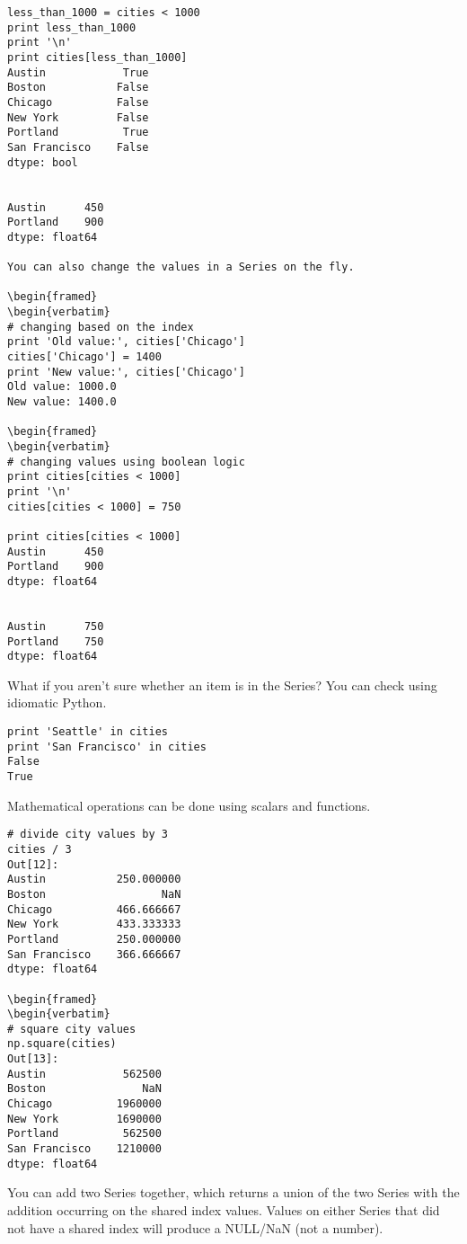 \documentclass[KSmain.tex]{subfiles}
\begin{document}
\begin{framed}
\begin{verbatim}
less_than_1000 = cities < 1000
print less_than_1000
print '\n'
print cities[less_than_1000]
Austin            True
Boston           False
Chicago          False
New York         False
Portland          True
San Francisco    False
dtype: bool


Austin      450
Portland    900
dtype: float64

You can also change the values in a Series on the fly.

\begin{framed}
\begin{verbatim}
# changing based on the index
print 'Old value:', cities['Chicago']
cities['Chicago'] = 1400
print 'New value:', cities['Chicago']
Old value: 1000.0
New value: 1400.0

\begin{framed}
\begin{verbatim}
# changing values using boolean logic
print cities[cities < 1000]
print '\n'
cities[cities < 1000] = 750

print cities[cities < 1000]
Austin      450
Portland    900
dtype: float64


Austin      750
Portland    750
dtype: float64
\end{verbatim}
\end{framed}
What if you aren't sure whether an item is in the Series? You can check using idiomatic Python.

\begin{framed}
\begin{verbatim}
print 'Seattle' in cities
print 'San Francisco' in cities
False
True
\end{verbatim}
\end{framed}
Mathematical operations can be done using scalars and functions.

\begin{framed}
\begin{verbatim}
# divide city values by 3
cities / 3
Out[12]:
Austin           250.000000
Boston                  NaN
Chicago          466.666667
New York         433.333333
Portland         250.000000
San Francisco    366.666667
dtype: float64

\begin{framed}
\begin{verbatim}
# square city values
np.square(cities)
Out[13]:
Austin            562500
Boston               NaN
Chicago          1960000
New York         1690000
Portland          562500
San Francisco    1210000
dtype: float64
\end{verbatim}
\end{framed}
You can add two Series together, which returns a union of the two Series with the addition occurring on the shared index values. Values on either Series that did not have a shared index will produce a NULL/NaN (not a number).
\end{document}
